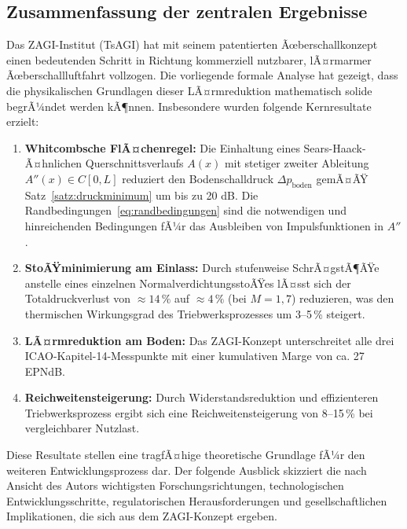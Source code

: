 ﻿\documentclass[12pt,a4paper]{article}
\theoremstyle{definition}
\theoremstyle{remark}
\begin{document}
\subsection{Zusammenfassung der zentralen Ergebnisse}

Das ZAGI-Institut (TsAGI) hat mit seinem patentierten Ãœberschallkonzept einen bedeutenden
Schritt in Richtung kommerziell nutzbarer, lÃ¤rmarmer Ãœberschallluftfahrt vollzogen. Die
vorliegende formale Analyse hat gezeigt, dass die physikalischen Grundlagen dieser
LÃ¤rmreduktion mathematisch solide begrÃ¼ndet werden kÃ¶nnen. Insbesondere wurden folgende
Kernresultate erzielt:

\begin{enumerate}[label=\textbf{K\arabic*.}]
  \item \textbf{Whitcombsche FlÃ¤chenregel:} Die Einhaltung eines Sears-Haack-Ã¤hnlichen
        Querschnittsverlaufs $A(x)$ mit stetiger zweiter Ableitung $A''(x) \in C[0,L]$
        reduziert den Bodenschalldruck $\Delta p_\text{boden}$ gemÃ¤ÃŸ
        Satz~\ref{satz:druckminimum} um bis zu 20 dB. Die Randbedingungen~\eqref{eq:randbedingungen}
        sind die notwendigen und hinreichenden Bedingungen fÃ¼r das Ausbleiben von Impulsfunktionen
        in $A''$.

  \item \textbf{StoÃŸminimierung am Einlass:} Durch stufenweise SchrÃ¤gstÃ¶ÃŸe anstelle eines
        einzelnen NormalverdichtungsstoÃŸes lÃ¤sst sich der Totaldruckverlust von $\approx 14\,\%$
        auf $\approx 4\,\%$ (bei $M = 1{,}7$) reduzieren, was den thermischen Wirkungsgrad
        des Triebwerksprozesses um 3--5\,\% steigert.

  \item \textbf{LÃ¤rmreduktion am Boden:} Das ZAGI-Konzept unterschreitet alle drei
        ICAO-Kapitel-14-Messpunkte mit einer kumulativen Marge von ca. 27 EPNdB.

  \item \textbf{Reichweitensteigerung:} Durch Widerstandsreduktion und effizienteren
        Triebwerksprozess ergibt sich eine Reichweitensteigerung von 8--15\,\% bei
        vergleichbarer Nutzlast.
\end{enumerate}

Diese Resultate stellen eine tragfÃ¤hige theoretische Grundlage fÃ¼r den weiteren
Entwicklungsprozess dar. Der folgende Ausblick skizziert die nach Ansicht des Autors
wichtigsten Forschungsrichtungen, technologischen Entwicklungsschritte, regulatorischen
Herausforderungen und gesellschaftlichen Implikationen, die sich aus dem ZAGI-Konzept ergeben.
\end{document}
